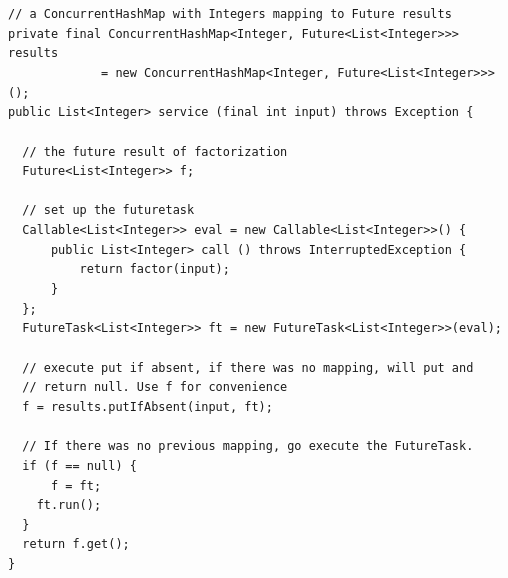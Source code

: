 \documentclass{article}
\begin{document}
    \lstinline|// a ConcurrentHashMap with Integers mapping to Future results|\\
    \lstinline|private final ConcurrentHashMap<Integer, Future<List<Integer>>> results|\\
    \lstinline|             = new ConcurrentHashMap<Integer, Future<List<Integer>>>();|\\
    \lstinline|public List<Integer> service (final int input) throws Exception {|\\\\
    \lstinline|  // the future result of factorization|\\
    \lstinline|  Future<List<Integer>> f;|\\\\
    \lstinline|  // set up the futuretask|\\
    \lstinline|  Callable<List<Integer>> eval = new Callable<List<Integer>>() {|\\
    \lstinline|      public List<Integer> call () throws InterruptedException {|\\
    \lstinline|          return factor(input);|\\
    \lstinline|      }|\\
    \lstinline|  };|\\
    \lstinline|  FutureTask<List<Integer>> ft = new FutureTask<List<Integer>>(eval);|\\\\
    \lstinline|  // execute put if absent, if there was no mapping, will put and|\\
    \lstinline|  // return null. Use f for convenience|\\
    \lstinline|  f = results.putIfAbsent(input, ft);|\\\\
    \lstinline|  // If there was no previous mapping, go execute the FutureTask.|\\
    \lstinline|  if (f == null) {|\\
    \lstinline|      f = ft;|\\
    \lstinline|    ft.run();|\\
    \lstinline|  }|\\
    \lstinline|  return f.get();|\\
    \lstinline|}|
\end{document}
